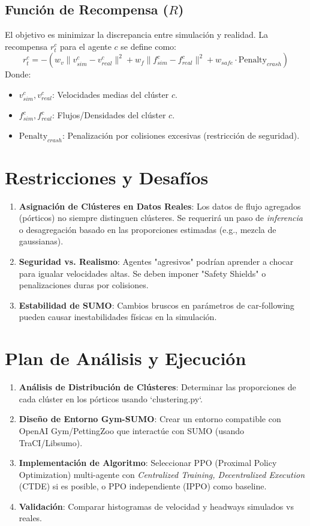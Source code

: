\documentclass{article}
\begin{document}
\subsection{Función de Recompensa ($R$)}
El objetivo es minimizar la discrepancia entre simulación y realidad. La recompensa $r_t^c$ para el agente $c$ se define como:
\begin{equation}
    r_t^c = - \left( w_v \| v_{sim}^c - v_{real}^c \|^2 + w_f \| f_{sim}^c - f_{real}^c \|^2 + w_{safe} \cdot \text{Penalty}_{crash} \right)
\end{equation}
Donde:
\begin{itemize}
    \item $v_{sim}^c, v_{real}^c$: Velocidades medias del clúster $c$.
    \item $f_{sim}^c, f_{real}^c$: Flujos/Densidades del clúster $c$.
    \item $\text{Penalty}_{crash}$: Penalización por colisiones excesivas (restricción de seguridad).
\end{itemize}

\section{Restricciones y Desafíos}
\begin{enumerate}
    \item \textbf{Asignación de Clústeres en Datos Reales}: Los datos de flujo agregados (pórticos) no siempre distinguen clústeres. Se requerirá un paso de \textit{inferencia} o desagregación basado en las proporciones estimadas (e.g., mezcla de gaussianas).
    \item \textbf{Seguridad vs. Realismo}: Agentes "agresivos" podrían aprender a chocar para igualar velocidades altas. Se deben imponer "Safety Shields" o penalizaciones duras por colisiones.
    \item \textbf{Estabilidad de SUMO}: Cambios bruscos en parámetros de car-following pueden causar inestabilidades físicas en la simulación.
\end{enumerate}

\section{Plan de Análisis y Ejecución}
\begin{enumerate}
    \item \textbf{Análisis de Distribución de Clústeres}: Determinar las proporciones de cada clúster en los pórticos usando `clustering.py`.
    \item \textbf{Diseño de Entorno Gym-SUMO}: Crear un entorno compatible con OpenAI Gym/PettingZoo que interactúe con SUMO (usando TraCI/Libsumo).
    \item \textbf{Implementación de Algoritmo}: Seleccionar PPO (Proximal Policy Optimization) multi-agente con \textit{Centralized Training, Decentralized Execution} (CTDE) si es posible, o PPO independiente (IPPO) como baseline.
    \item \textbf{Validación}: Comparar histogramas de velocidad y headways simulados vs reales.
\end{enumerate}
\end{document}

